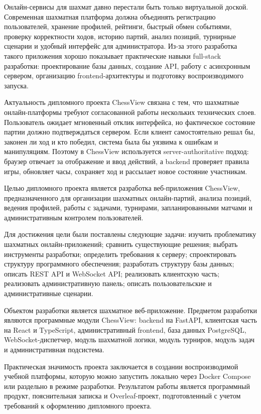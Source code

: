 
Онлайн-сервисы для шахмат давно перестали быть только виртуальной доской. Современная шахматная платформа должна объединять регистрацию пользователей, хранение профилей, рейтинги, быстрый обмен событиями, проверку корректности ходов, историю партий, анализ позиций, турнирные сценарии и удобный интерфейс для администратора. Из-за этого разработка такого приложения хорошо показывает практические навыки full-stack разработки: проектирование базы данных, создание API, работу с асинхронным сервером, организацию frontend-архитектуры и подготовку воспроизводимого запуска.

Актуальность дипломного проекта ChessView связана с тем, что шахматные онлайн-платформы требуют согласованной работы нескольких технических слоев. Пользователь ожидает мгновенный отклик интерфейса, но фактическое состояние партии должно подтверждаться сервером. Если клиент самостоятельно решал бы, законен ли ход и кто победил, система была бы уязвима к ошибкам и манипуляциям. Поэтому в ChessView используется server-authoritative подход: браузер отвечает за отображение и ввод действий, а backend проверяет правила игры, обновляет часы, сохраняет ход и рассылает новое состояние участникам.

Целью дипломного проекта является разработка веб-приложения ChessView, предназначенного для организации шахматных онлайн-партий, анализа позиций, ведения профилей, работы с задачами, турнирами, запланированными матчами и административным контролем пользователей.

Для достижения цели были поставлены следующие задачи: изучить проблематику шахматных онлайн-приложений; сравнить существующие решения; выбрать инструменты разработки; определить требования к серверу; спроектировать структуру программного обеспечения; разработать структуру базы данных; описать REST API и WebSocket API; реализовать клиентскую часть; реализовать административную панель; описать пользовательские и административные сценарии.

Объектом разработки является шахматное веб-приложение. Предметом разработки являются программные модули ChessView: backend на FastAPI, клиентская часть на React и TypeScript, административный frontend, база данных PostgreSQL, WebSocket-диспетчер, модуль шахматной логики, модуль турниров, модуль задач и административная подсистема.

Практическая значимость проекта заключается в создании воспроизводимой учебной платформы, которую можно запустить локально через Docker Compose или раздельно в режиме разработки. Результатом работы является программный продукт, пояснительная записка и Overleaf-проект, подготовленный с учетом требований к оформлению дипломного проекта.
